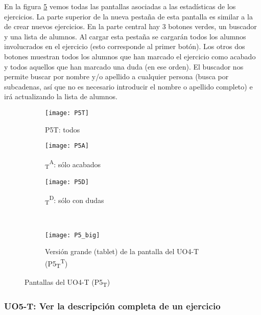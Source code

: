 En la figura \ref{fig:diseno-e-implementacion:interfaces:profesor:uo4-t} vemos todas las pantallas asociadas a las estadísticas de los ejercicios. La parte superior de la nueva pestaña de esta pantalla es similar a la de crear nuevos ejercicios. En la parte central hay 3 botones verdes, un buscador y una lista de alumnos. Al cargar esta pestaña se cargarán todos los alumnos involucrados en el ejercicio (esto corresponde al primer botón). Los otros dos botones muestran todos los alumnos que han marcado el ejercicio como acabado y todos aquellos que han marcado una duda (en ese orden). El buscador nos permite buscar por nombre y/o apellido a cualquier persona (busca por subcadenas, así que no es necesario introducir el nombre o apellido completo) e irá actualizando la lista de alumnos.\\

\noindent
\begin{figure}[!htbp]
\begin{subfigure}[t]{0.3\textwidth}
	\centering
	\texttt{[image: P5T]}
	\caption{P5T: todos}
	\label{fig:diseno-e-implementacion:interfaces:profesor:uo4-t:p5t}
\end{subfigure}
%
\begin{subfigure}[t]{0.3\textwidth}
	\centering
	\texttt{[image: P5A]}
	\caption{\textsubscript{T}\textsuperscript{A}: sólo acabados}
	\label{fig:diseno-e-implementacion:interfaces:profesor:uo4-t:p5a}
\end{subfigure}
%
\begin{subfigure}[t]{0.3\textwidth}
	\centering
	\texttt{[image: P5D]}
	\caption{\textsubscript{T}\textsuperscript{D}: sólo con dudas}
	\label{fig:diseno-e-implementacion:interfaces:profesor:uo4-t:p5d}
\end{subfigure}
\\
\begin{subfigure}[t]{\textwidth}
	\centering
	\texttt{[image: P5\_big]}
	\caption{Versión grande (tablet) de la pantalla del UO4-T (P5\textsubscript{T}\textsuperscript{T})}
	\label{fig:diseno-e-implementacion:interfaces:profesor:uo4-t:p5a-big}
\end{subfigure}

\caption{Pantallas del UO4-T (P5\textsubscript{T})}
\label{fig:diseno-e-implementacion:interfaces:profesor:uo4-t}
\end{figure}

\subsubsection{UO5-T: Ver la descripción completa de un ejercicio}
\label{diseno-e-implementacion:interfaces:profesor:uo5-t}

